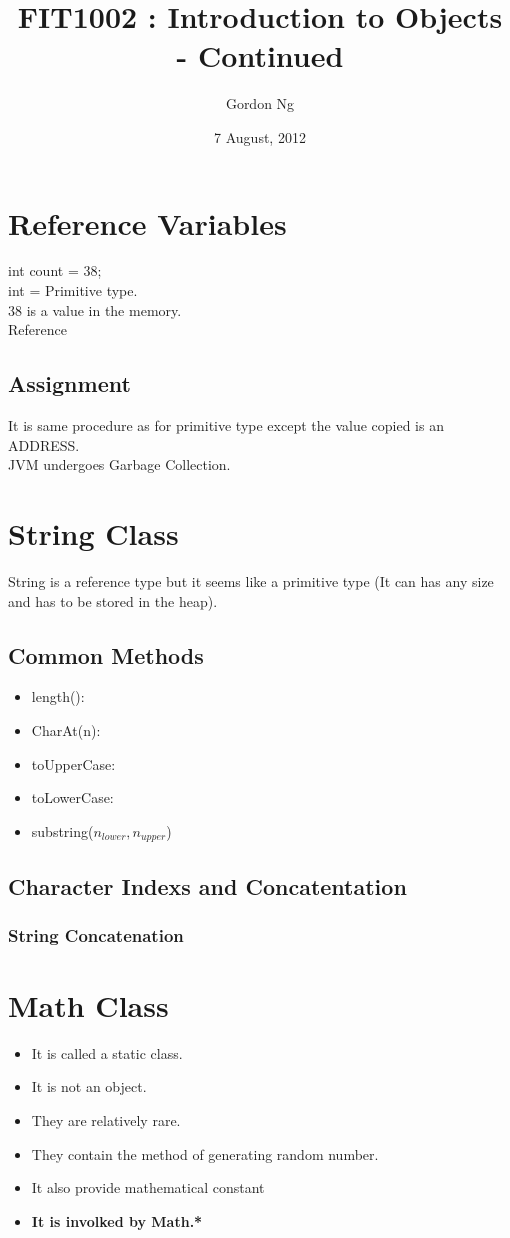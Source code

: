 \documentclass[12pt]{article}
\begin{document}
\title{FIT1002 : Introduction to Objects - Continued}
\date{7 August, 2012}
\author{Gordon Ng}
\maketitle

\pagebreak
\tableofcontents
\pagebreak
\section{Reference Variables}
int count = 38; \\
int = Primitive type. \\
38 is a value in the memory. \\
Reference \\
\subsection{Assignment}
It is same procedure as for primitive type except the value copied is an ADDRESS. \\
JVM undergoes Garbage Collection. 

\section{String Class}
String is a reference type but it seems like a primitive type (It can has any size and has to be stored in the heap).
\subsection{Common Methods}
\begin{itemize}
\item length():
\item CharAt(n):
\item toUpperCase:
\item toLowerCase:
\item substring($n_{lower},n_{upper}$)
\end{itemize}
\pagebreak
\subsection{Character Indexs and Concatentation}
\subsubsection{String Concatenation}
\pagebreak
\section{Math Class}
\begin{itemize}
\item It is called a static class. 
\item It is not an object.
\item They are relatively rare.
\item They contain the method of generating random number.
\item It also provide mathematical constant
\item \textbf{It is involked by Math.*}
\end{itemize}
\end{document}
